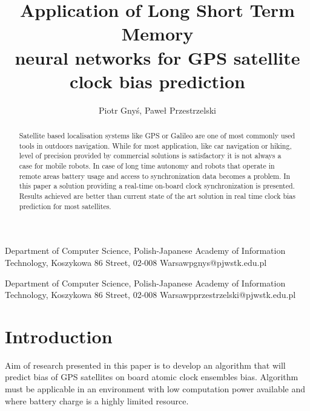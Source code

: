 \documentclass{kybernetika}
\begin{document}
\pagestyle{myheadings}
\title{Application of Long Short Term Memory \\  neural  networks for GPS satellite \\ clock 
bias prediction}

\author{Piotr Gny\'{s}, Pawe\l{} Przestrzelski}

{Department of Computer Science,  Polish-Japanese Academy of Information Technology,
Koszykowa 86 Street, 02-008 Warsaw}{pgnys@pjwstk.edu.pl}

{Department of Computer Science,  Polish-Japanese Academy of Information Technology,
Koszykowa 86 Street, 02-008 Warsaw}{pprzestrzelski@pjwstk.edu.pl}


\maketitle

\begin{abstract}
Satellite based localisation systems like GPS or Galileo are one of most commonly used tools
in outdoors navigation. While for most application, like car navigation or hiking, level of
precision provided by commercial solutions is satisfactory it is not always a case for mobile
robots. In case of long time autonomy and robots that operate in remote areas battery usage
and access to synchronization data becomes a problem. In this paper a solution providing a 
real-time on-board clock synchronization is presented. Results achieved are better than current
state of the art solution in real time clock bias prediction for most satellites.
\end{abstract}




\section{Introduction}
Aim of research presented in this paper is to develop an algorithm that will predict bias of
GPS satellites on board atomic clock ensembles bias. Algorithm must be applicable in an 
environment with low computation power available and where battery charge is a highly limited
resource.
\end{document}
